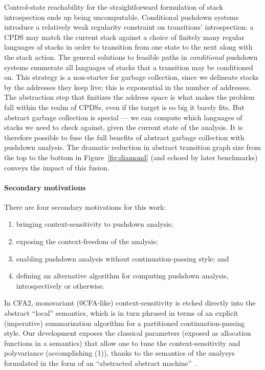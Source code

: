 Control-state reachability for the straightforward formulation of stack introspection ends up being uncomputable.
Conditional pushdown systems introduce a relatively weak regularity constraint on transitions' introspection:
a CPDS may match the current stack against a choice of finitely many regular languages of stacks in order to transition from one state to the next along with the stack action.
The general solutions to feasible paths in \emph{conditional} pushdown systems enumerate all languages of stacks that a transition may be conditioned on.
This strategy is a non-starter for garbage collection, since we delineate stacks by the addresses they keep live; this is exponential in the number of addresses.
The abstraction step that finitizes the address space is what makes the problem fall within the realm of CPDSs, even if the target is so big it barely fits.
But abstract garbage collection is special --- we can compute which languages of stacks we need to check against, given the current state of the analysis.
It is therefore possible to fuse the full benefits of abstract garbage collection with pushdown analysis.
The dramatic reduction in abstract transition graph size
from the top to the bottom in Figure~\ref{fig:diamond}
(and echoed by later benchmarks) conveys the impact
of this fusion.



\paragraph{Secondary motivations}
There are four secondary motivations for this work:
\begin{enumerate}
\item bringing context-sensitivity to pushdown analysis;
\item exposing the context-freedom of the analysis;
\item enabling pushdown analysis without continuation-passing style; and
\item defining an
  alternative algorithm for computing pushdown analysis,
  introspectively or otherwise.
\end{enumerate}
In CFA2, monovariant (0CFA-like) context-sensitivity is etched directly into
the abstract ``local'' semantics, which is in turn
phrased in terms of an explicit (imperative) summarization algorithm
for a partitioned continuation-passing style.
Our development exposes the classical parameters (exposed as
allocation functions in a semantics) that allow one to tune the
context-sensitivity and polyvariance (accomplishing (1)), thanks to
the semantics of the analysys formulated in the form of an
``abstracted abstract machine''~\cite{mattmight:VanHorn:2012:AAM}.


